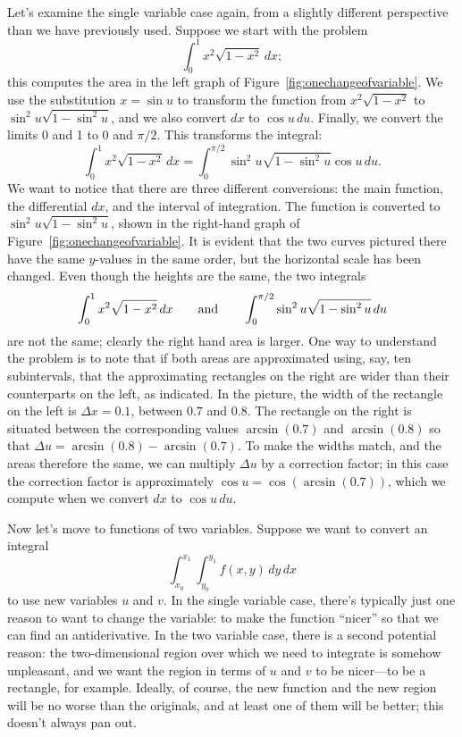 Let's examine the single variable case again, from a slightly
different perspective than we have previously used.
Suppose we start with the problem
\[\int_0^1 x^2\sqrt{1-x^2}\,dx;\]
this computes the area in the left graph of 
Figure~\ref{fig:onechangeofvariable}.
We use the substitution $x=\sin u$ to transform the function from 
$x^2\sqrt{1-x^2}$ to $\sin^2u\sqrt{1-\sin^2u}$, and we also convert
$dx$ to $\cos u\,du$. Finally, we convert the
limits 0 and 1 to 0 and $\pi/2$.
This transforms the integral:
\[\int_0^1 x^2\sqrt{1-x^2}\,dx=\int_0^{\pi/2}\sin^2u\sqrt{1-\sin^2u} \cos u\,du.\]
We want to notice that there are three different conversions: the
main function, the differential $dx$, and the interval of
integration. The function is converted to
$\sin^2u\sqrt{1-\sin^2u}$, shown in the right-hand graph of 
Figure~\ref{fig:onechangeofvariable}. It is evident that the two
curves pictured there have the same $y$-values in the same order, but
the horizontal scale has been changed. Even though the heights are the
same, the two integrals
\[\int_0^1 x^2\sqrt{1-x^2}\,dx\qquad\hbox{and}\qquad
\int_0^{\pi/2}\sin^2u\sqrt{1-\sin^2u}\,du\]
are not the same; clearly the right hand area is larger. One way to
understand the problem is to note that if both areas are approximated
using, say, ten subintervals, that the approximating rectangles on the
right are wider than their counterparts on the left, as indicated. In
the picture, the width of the rectangle on the left is $\Delta x=0.1$,
between $0.7$ and $0.8$.  The rectangle on the right is situated
between the corresponding values $\arcsin(0.7)$ and $\arcsin(0.8)$ so
that $\Delta u=\arcsin(0.8)-\arcsin(0.7)$. To
make the widths match, and the areas therefore the same, we can
multiply $\Delta u$ by a correction factor; in this case the
correction factor is approximately $\cos u=\cos(\arcsin(0.7))$, which
we compute when we convert $dx$ to $\cos u\,du$.

Now let's move to functions of two variables. Suppose we want to
convert an integral
\[\int_{x_0}^{x_1}\int_{y_0}^{y_1} f(x,y)\,dy\,dx\]
to use new variables $u$ and $v$. In the single variable case, there's
typically just one reason to want to change the variable: to make the
function ``nicer'' so that we can find an antiderivative. In the two
variable case, there is a second potential reason: the two-dimensional
region over which we need to integrate is somehow unpleasant, and we
want the region in terms of $u$ and $v$ to be nicer---to be a
rectangle, for example. Ideally, of course, the new function and the
new region will be no worse than the originals, and at least one of
them will be better; this doesn't always pan out.

